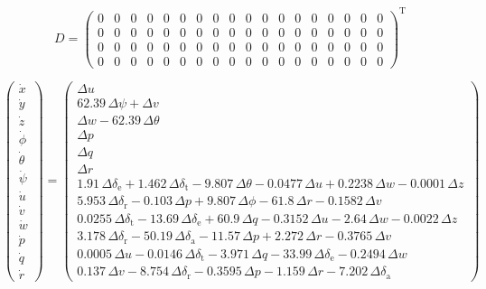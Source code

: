 \documentclass{article}
\begin{document}
\begin{dmath}
D = \left(\begin{array}{cccccccccccccccccc} 0 & 0 & 0 & 0 & 0 & 0 & 0 & 0 & 0 & 0 & 0 & 0 & 0 & 0 & 0 & 0 & 0 & 0\\ 0 & 0 & 0 & 0 & 0 & 0 & 0 & 0 & 0 & 0 & 0 & 0 & 0 & 0 & 0 & 0 & 0 & 0\\ 0 & 0 & 0 & 0 & 0 & 0 & 0 & 0 & 0 & 0 & 0 & 0 & 0 & 0 & 0 & 0 & 0 & 0\\ 0 & 0 & 0 & 0 & 0 & 0 & 0 & 0 & 0 & 0 & 0 & 0 & 0 & 0 & 0 & 0 & 0 & 0 \end{array}\right)^{\mathrm{T}}
\end{dmath}

\newpage

\begin{dmath}
\left(\begin{array}{c} \dot{x}\\ \dot{y}\\ \dot{z}\\ \dot{\phi }\\ \dot{\theta }\\ \dot{\psi }\\ \dot{u}\\ \dot{v}\\ \dot{w}\\ \dot{p}\\ \dot{q}\\ \dot{r} \end{array}\right) = \left(\begin{array}{c} \Delta u\\ 62.39\,\Delta \psi +\Delta v\\ \Delta w-62.39\,\Delta \theta \\ \Delta p\\ \Delta q\\ \Delta r\\ 1.91\,\Delta \delta _{\mathrm{e}}+1.462\,\Delta \delta _{\mathrm{t}}-9.807\,\Delta \theta -0.0477\,\Delta u+0.2238\,\Delta w-0.0001\,\Delta z\\ 5.953\,\Delta \delta _{\mathrm{r}}-0.103\,\Delta p+9.807\,\Delta \phi -61.8\,\Delta r-0.1582\,\Delta v\\ 0.0255\,\Delta \delta _{\mathrm{t}}-13.69\,\Delta \delta _{\mathrm{e}}+60.9\,\Delta q-0.3152\,\Delta u-2.64\,\Delta w-0.0022\,\Delta z\\ 3.178\,\Delta \delta _{\mathrm{r}}-50.19\,\Delta \delta _{\mathrm{a}}-11.57\,\Delta p+2.272\,\Delta r-0.3765\,\Delta v\\ 0.0005\,\Delta u-0.0146\,\Delta \delta _{\mathrm{t}}-3.971\,\Delta q-33.99\,\Delta \delta _{\mathrm{e}}-0.2494\,\Delta w\\ 0.137\,\Delta v-8.754\,\Delta \delta _{\mathrm{r}}-0.3595\,\Delta p-1.159\,\Delta r-7.202\,\Delta \delta _{\mathrm{a}} \end{array}\right)
\end{dmath}
\end{document}
